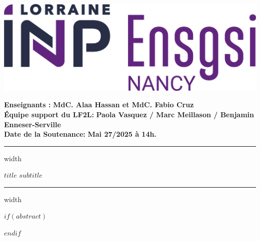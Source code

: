 
\begin{minipage}{.3\textwidth}
    \flushleft
    \includegraphics[scale=.27]{../assets/img/ENSGSI.png}
\end{minipage}
    \hfill
\begin{minipage}{.64\textwidth}   
    \bigskip
    
    \textbf{\textcolor{gsi_violet}{Enseignants :}} \textbf{MdC. Alaa Hassan et MdC. Fabio Cruz} \\
    \textbf{\textcolor{gsi_violet}{Équipe support du LF2L:}} \textbf{Paola Vasquez / Marc Meillason / Benjamin Enneser-Serville} \\
    \bigskip    
    \textbf{\textcolor{gsi_violet}{Date de la Soutenance:}} \textbf{Mai 27/2025 à 14h. }        
\end{minipage}   

\bigskip

      
\bigskip

\hrule height .1pt depth .2pt width \textwidth

\bigskip

\begin{center}
\textbf{\sffamily\Large $title$} \newline
\textbf{\sffamily\normalsize $subtitle$}
\end{center}

\bigskip
\hrule height .1pt depth .2pt width \textwidth

\bigskip

$if(abstract)$
\begin{abstract}
$abstract$
\end{abstract}
$endif$

